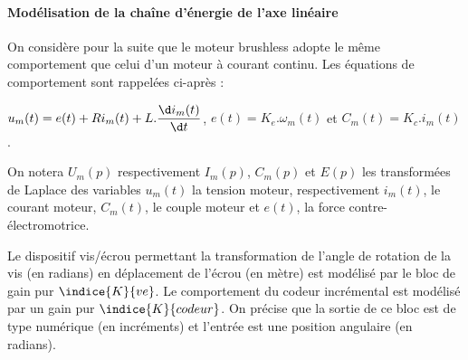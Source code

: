 \ifprof
\else
\paragraph{Modélisation de la chaîne d'énergie de l'axe linéaire}

On considère pour la suite que le moteur brushless adopte le même comportement que celui d'un moteur à courant continu. Les équations de comportement sont rappelées ci-après :


{\centering
$u_m(t)=e(t)+R i_m(t)+L.\dfrac{\d i_m(t)}{\d t}$,\hspace{0.5cm}  $e(t) = K_e.\omega_m(t)$ \hspace{0.5cm} et \hspace{0.5cm}  $C_m(t) = K_c.i_m(t)$.  
\par}

On notera $U_m(p)$ respectivement $I_m(p)$, $C_m(p)$ et $E(p)$ les transformées de Laplace des variables $u_m(t)$ la tension moteur, respectivement $i_m(t)$, le courant moteur, $C_m(t)$, le couple moteur et $e(t)$, la force contre-électromotrice.

Le dispositif vis/écrou permettant la transformation de l'angle de rotation de la vis (en radians) en déplacement de l'écrou (en mètre) est modélisé par le bloc de gain pur $\indice{K}{ve}$.
Le comportement du codeur incrémental est modélisé par un gain pur $\indice{K}{codeur}$. On précise que la sortie de ce bloc est de type numérique (en incréments) et l'entrée est une position angulaire (en radians).
\fi


\ifprof
{}
\fi

